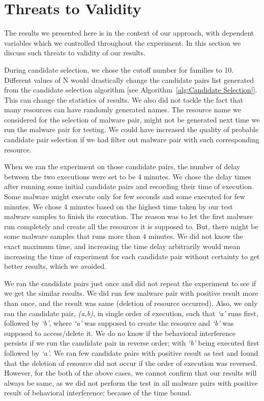 \section{Threats to Validity}
\label{sec:Threats to Validity}
The results we presented here is in the context of our approach, with dependent variables which we controlled throughout the experiment.
In this section we discuss such threats to validity of our results.

During candidate selection, we chose the cutoff number for families to 10.
Different values of N would drastically change the candidate pairs list generated from the candidate selection algorithm [see Algorithm~\autoref{alg:Candidate Selection}].
This can change the statistics of results.
We also did not tackle the fact that many resources can have randomly generated names.
The resource name we considered for the selection of malware pair, might not be generated next time we run the malware pair for testing.
We could have increased the quality of probable candidate pair selection if we had filter out malware pair with such corresponding resource.

When we ran the experiment on those candidate pairs, the number of delay between the two executions were set to be 4 minutes.
We chose the delay times after running some initial candidate pairs and recording their time of execution.
Some malware might execute only for few seconds and some executed for few minutes.
We chose 4 minutes based on the highest time taken by our test malware samples to finish its execution.
The reason was to let the first malware run completely and create all the resources it is supposed to.
But, there might be some malware samples that runs more than 4 minutes.
We did not know the exact maximum time, and increasing the time delay arbitrarily would mean increasing the time of experiment for each candidate pair without certainty to get better results, which we avoided.

We ran the candidate pairs just once and did not repeat the experiment to see if we get the similar results.
We did run few malware pair with positive result more than once, and the result was same (deletion of resource occurred).
Also, we only ran the candidate pair, \emph{(a,b)}, in single order of execution, such that \emph{`a'} runs first, followed by \emph{`b'}, where \emph{`a'} was supposed to create the resource and \emph{`b'} was supposed to access/delete it.
We do no know if the behavioral interference persists if we run the candidate pair in reverse order; with \emph{`b'} being executed first followed by \emph{`a'}.
We ran few candidate pairs with positive result as test and found that the deletion of resource did not occur if the order of execution was reversed.
However, for the both of the above cases, we cannot confirm that our results will always be same, as we did not perform the test in all malware pairs with positive result of behavioral interference; because of the time bound.

